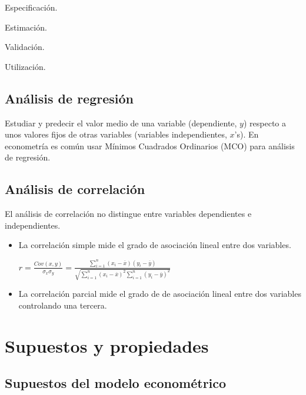 \documentclass[10pt, a4paper, landscape]{extarticle}
\begin{document}
\begin{multicols}{3}
\begin{enumerate}[leftmargin=*]
\setlength{\multicolsep}{0pt}
\begin{multicols}{2}
\item Especificación.
\item Estimación.
\columnbreak
\item Validación.
\item Utilización.
\end{multicols}
\end{enumerate}

\subsection*{Análisis de regresión}
Estudiar y predecir el valor medio de una variable (dependiente, $y$) respecto a unos valores fijos de otras variables (variables independientes, $x$'s). En econometría es común usar Mínimos Cuadrados Ordinarios (MCO) para análisis de regresión.

\subsection*{Análisis de correlación}
El análisis de correlación no distingue entre variables dependientes e independientes.

\begin{itemize}[leftmargin=*]
\item La correlación simple mide el grado de asociación lineal entre dos variables.

\begin{center}
$r = \frac{Cov(x,y)}{\sigma_x \sigma_y} = \frac{\sum_{i=1}^n (x_i - \overline{x})(y_i - \overline{y})}{\sqrt{\sum_{i=1}^n (x_i - \overline{x})^2 \sum_{i=1}^n (y_i - \overline{y})^2}}$
\end{center}

\item La correlación parcial mide el grado de de asociación lineal entre dos variables controlando una tercera.
\end{itemize}

\columnbreak

\section*{Supuestos y propiedades}
\subsection*{Supuestos del modelo econométrico}


\end{multicols}
\end{document}
